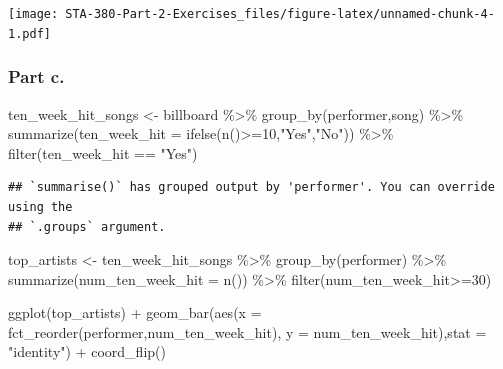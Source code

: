 \documentclass[
]{article}
\newenvironment{Shaded}{\begin{snugshade}}{\end{snugshade}}
\newcommand{\AttributeTok}[1]{\textcolor[rgb]{0.77,0.63,0.00}{#1}}
\newcommand{\DecValTok}[1]{\textcolor[rgb]{0.00,0.00,0.81}{#1}}
\newcommand{\FunctionTok}[1]{\textcolor[rgb]{0.00,0.00,0.00}{#1}}
\newcommand{\NormalTok}[1]{#1}
\newcommand{\OtherTok}[1]{\textcolor[rgb]{0.56,0.35,0.01}{#1}}
\newcommand{\SpecialCharTok}[1]{\textcolor[rgb]{0.00,0.00,0.00}{#1}}
\newcommand{\StringTok}[1]{\textcolor[rgb]{0.31,0.60,0.02}{#1}}
\begin{document}
\texttt{[image: STA-380-Part-2-Exercises\_files/figure-latex/unnamed-chunk-4-1.pdf]}

\hypertarget{part-c.}{%
\subsubsection{Part c.}\label{part-c.}}

\begin{Shaded}
\begin{Highlighting}[]
\NormalTok{ten\_week\_hit\_songs }\OtherTok{\textless{}{-}}\NormalTok{ billboard }\SpecialCharTok{\%\textgreater{}\%}
  \FunctionTok{group\_by}\NormalTok{(performer,song) }\SpecialCharTok{\%\textgreater{}\%}
  \FunctionTok{summarize}\NormalTok{(}\AttributeTok{ten\_week\_hit =} \FunctionTok{ifelse}\NormalTok{(}\FunctionTok{n}\NormalTok{()}\SpecialCharTok{\textgreater{}=}\DecValTok{10}\NormalTok{,}\StringTok{"Yes"}\NormalTok{,}\StringTok{"No"}\NormalTok{)) }\SpecialCharTok{\%\textgreater{}\%}
  \FunctionTok{filter}\NormalTok{(ten\_week\_hit }\SpecialCharTok{==} \StringTok{"Yes"}\NormalTok{)}
\end{Highlighting}
\end{Shaded}

\begin{verbatim}
## `summarise()` has grouped output by 'performer'. You can override using the
## `.groups` argument.
\end{verbatim}

\begin{Shaded}
\begin{Highlighting}[]
\NormalTok{top\_artists }\OtherTok{\textless{}{-}}\NormalTok{ ten\_week\_hit\_songs }\SpecialCharTok{\%\textgreater{}\%}
  \FunctionTok{group\_by}\NormalTok{(performer) }\SpecialCharTok{\%\textgreater{}\%}
  \FunctionTok{summarize}\NormalTok{(}\AttributeTok{num\_ten\_week\_hit =} \FunctionTok{n}\NormalTok{()) }\SpecialCharTok{\%\textgreater{}\%}
  \FunctionTok{filter}\NormalTok{(num\_ten\_week\_hit}\SpecialCharTok{\textgreater{}=}\DecValTok{30}\NormalTok{)}

\FunctionTok{ggplot}\NormalTok{(top\_artists) }\SpecialCharTok{+} \FunctionTok{geom\_bar}\NormalTok{(}\FunctionTok{aes}\NormalTok{(}\AttributeTok{x =} \FunctionTok{fct\_reorder}\NormalTok{(performer,num\_ten\_week\_hit), }\AttributeTok{y =}\NormalTok{ num\_ten\_week\_hit),}\AttributeTok{stat =} \StringTok{"identity"}\NormalTok{) }\SpecialCharTok{+} \FunctionTok{coord\_flip}\NormalTok{()}
\end{Highlighting}
\end{Shaded}
\end{document}

